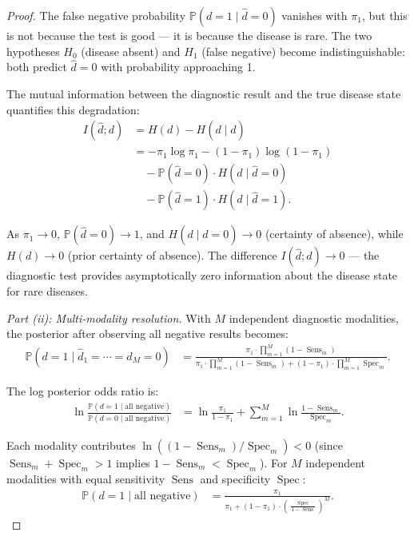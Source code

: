 \documentclass[11pt,a4paper]{article}
\theoremstyle{definition}
\DeclareMathOperator{\Sens}{Sens}
\DeclareMathOperator{\Spec}{Spec}
\newcommand{\Pbb}{\mathbb{P}}
\newcommand{\disease}{d}                       %
\newcommand{\diagnosis}{\hat{d}}               %
\begin{document}
\begin{proof}
The false negative probability $\Pbb(\disease=1 \mid \diagnosis=0)$ vanishes
with $\pi_1$, but this is not because the test is good --- it is because the
disease is rare. The two hypotheses $H_0$ (disease absent) and $H_1$
(false negative) become indistinguishable: both predict $\diagnosis=0$
with probability approaching 1.

The mutual information between the diagnostic result and the true disease
state quantifies this degradation:
\begin{align}
    I(\diagnosis; \disease) &= H(\disease) - H(\disease \mid \diagnosis) \\
    &= -\pi_1\log\pi_1 - (1-\pi_1)\log(1-\pi_1) \\
    &\quad - \Pbb(\diagnosis=0) \cdot H(\disease \mid \diagnosis=0) \\
    &\quad - \Pbb(\diagnosis=1) \cdot H(\disease \mid \diagnosis=1).
\end{align}

As $\pi_1 \to 0$, $\Pbb(\diagnosis=0) \to 1$, and
$H(\disease \mid \diagnosis=0) \to 0$ (certainty of absence), while
$H(\disease) \to 0$ (prior certainty of absence). The difference
$I(\diagnosis; \disease) \to 0$ --- the diagnostic test provides
asymptotically zero information about the disease state for rare diseases.

\medskip\noindent\textit{Part (ii): Multi-modality resolution.}
With $M$ independent diagnostic modalities, the posterior after observing
all negative results becomes:
\begin{align}
    \Pbb(\disease=1 \mid \diagnosis_1 = \cdots = \diagnosis_M = 0)
    &= \frac{\pi_1 \cdot \prod_{m=1}^{M} (1-\Sens_m)}
           {\pi_1 \cdot \prod_{m=1}^{M} (1-\Sens_m)
            + (1-\pi_1) \cdot \prod_{m=1}^{M} \Spec_m}.
\end{align}

The log posterior odds ratio is:
\begin{align}
    \ln\frac{\Pbb(\disease=1 \mid \text{all negative})}{\Pbb(\disease=0 \mid \text{all negative})}
    &= \ln\frac{\pi_1}{1-\pi_1} + \sum_{m=1}^{M} \ln\frac{1-\Sens_m}{\Spec_m}.
\end{align}

Each modality contributes $\ln((1-\Sens_m)/\Spec_m) < 0$ (since $\Sens_m + \Spec_m > 1$
implies $1-\Sens_m < \Spec_m$). For $M$ independent modalities with equal
sensitivity $\Sens$ and specificity $\Spec$:
\begin{align}
    \Pbb(\disease=1 \mid \text{all negative})
    &= \frac{\pi_1}{\pi_1 + (1-\pi_1) \cdot \left(\frac{\Spec}{1-\Sens}\right)^M}.
\end{align}


\end{proof}
\end{document}
